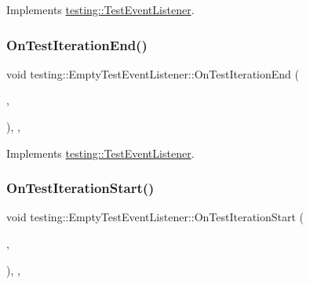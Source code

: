 Implements \hyperlink{classtesting_1_1TestEventListener_abb1c44525ef038500608b5dc2f17099b}{testing\+::\+Test\+Event\+Listener}.

\mbox{\label{classtesting_1_1EmptyTestEventListener_aae9c5c61e476f0c421402fb1dde434d2}} 
\subsubsection{\texorpdfstring{On\+Test\+Iteration\+End()}{OnTestIterationEnd()}}
{\footnotesize\ttfamily void testing\+::\+Empty\+Test\+Event\+Listener\+::\+On\+Test\+Iteration\+End (\begin{DoxyParamCaption}\item[{const \hyperlink{classtesting_1_1UnitTest}{Unit\+Test} \&}]{,  }\item[{int}]{ }\end{DoxyParamCaption})\hspace{0.3cm}{\ttfamily [inline]}, {\ttfamily [override]}, {\ttfamily [virtual]}}



Implements \hyperlink{classtesting_1_1TestEventListener_a550fdb3e55726e4cefa09f5697941425}{testing\+::\+Test\+Event\+Listener}.

\mbox{\label{classtesting_1_1EmptyTestEventListener_a31edf103561e8b4d747656bc2d927661}} 
\subsubsection{\texorpdfstring{On\+Test\+Iteration\+Start()}{OnTestIterationStart()}}
{\footnotesize\ttfamily void testing\+::\+Empty\+Test\+Event\+Listener\+::\+On\+Test\+Iteration\+Start (\begin{DoxyParamCaption}\item[{const \hyperlink{classtesting_1_1UnitTest}{Unit\+Test} \&}]{,  }\item[{int}]{ }\end{DoxyParamCaption})\hspace{0.3cm}{\ttfamily [inline]}, {\ttfamily [override]}, {\ttfamily [virtual]}}



